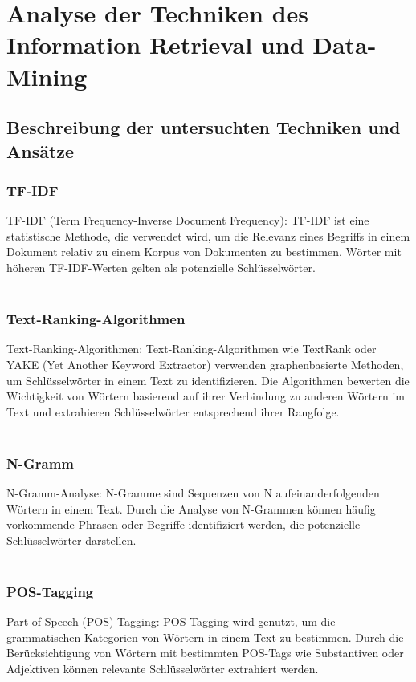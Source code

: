 \chapter{Analyse der Techniken des Information Retrieval und Data-Mining}
\label{chap:staffingadvisor}

\section{Beschreibung der untersuchten Techniken und Ansätze}

\subsection{TF-IDF}
TF-IDF (Term Frequency-Inverse Document Frequency): TF-IDF ist eine statistische Methode, die verwendet wird, um die Relevanz eines Begriffs in einem Dokument relativ zu einem Korpus von Dokumenten zu bestimmen. Wörter mit höheren TF-IDF-Werten gelten als potenzielle Schlüsselwörter.\\ \cite{bafna2016document}\cite{ramos2003using}\\

\subsection{Text-Ranking-Algorithmen}
Text-Ranking-Algorithmen: Text-Ranking-Algorithmen wie TextRank oder YAKE (Yet Another Keyword Extractor) verwenden graphenbasierte Methoden, um Schlüsselwörter in einem Text zu identifizieren. Die Algorithmen bewerten die Wichtigkeit von Wörtern basierend auf ihrer Verbindung zu anderen Wörtern im Text und extrahieren Schlüsselwörter entsprechend ihrer Rangfolge.\\ \cite{mihalcea2004textrank}\cite{zhang2020empirical}\cite{pay2019ensemble}\\

\subsection{N-Gramm}
N-Gramm-Analyse: N-Gramme sind Sequenzen von N aufeinanderfolgenden Wörtern in einem Text. Durch die Analyse von N-Grammen können häufig vorkommende Phrasen oder Begriffe identifiziert werden, die potenzielle Schlüsselwörter darstellen.\\ \cite{pirk2019implementierung}\\

\subsection{POS-Tagging}
Part-of-Speech (POS) Tagging: POS-Tagging wird genutzt, um die grammatischen Kategorien von Wörtern in einem Text zu bestimmen. Durch die Berücksichtigung von Wörtern mit bestimmten POS-Tags wie Substantiven oder Adjektiven können relevante Schlüsselwörter extrahiert werden.\\ \cite{kumawat2015pos}\cite{nakagawa2007hybrid}\\

